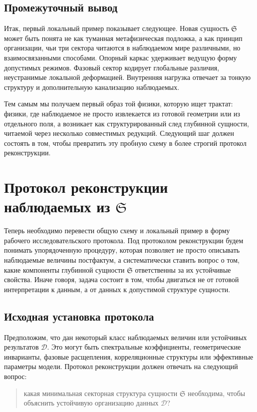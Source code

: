 \documentclass[12pt,a4paper]{article}
\begin{document}
\subsection{Промежуточный вывод}

Итак, первый локальный пример показывает следующее. Новая сущность \(\mathfrak{S}\) может быть понята не как туманная метафизическая подложка, а как принцип организации, чьи три сектора читаются в наблюдаемом мире различными, но взаимосвязанными способами. Опорный каркас удерживает ведущую форму допустимых режимов. Фазовый сектор кодирует глобальные различия, неустранимые локальной деформацией. Внутренняя нагрузка отвечает за тонкую структуру и дополнительную канализацию наблюдаемых.

Тем самым мы получаем первый образ той физики, которую ищет трактат: физики, где наблюдаемое не просто извлекается из готовой геометрии или из отдельного поля, а возникает как структурированный след глубинной сущности, читаемой через несколько совместимых редукций. Следующий шаг должен состоять в том, чтобы превратить эту пробную схему в более строгий протокол реконструкции.

\section{Протокол реконструкции наблюдаемых из \texorpdfstring{$\mathfrak{S}$}{S}}

Теперь необходимо перевести общую схему и локальный пример в форму рабочего исследовательского протокола. Под протоколом реконструкции будем понимать упорядоченную процедуру, которая позволяет не просто описывать наблюдаемые величины постфактум, а систематически ставить вопрос о том, какие компоненты глубинной сущности \(\mathfrak{S}\) ответственны за их устойчивые свойства. Иначе говоря, задача состоит в том, чтобы двигаться не от готовой интерпретации к данным, а от данных к допустимой структуре сущности.

\subsection{Исходная установка протокола}

Предположим, что дан некоторый класс наблюдаемых величин или устойчивых результатов \(\mathcal{D}\). Это могут быть спектральные коэффициенты, геометрические инварианты, фазовые расщепления, корреляционные структуры или эффективные параметры модели. Протокол реконструкции должен отвечать на следующий вопрос:
\begin{quote}
какая минимальная секторная структура сущности \(\mathfrak{S}\) необходима, чтобы объяснить устойчивую организацию данных \(\mathcal{D}\)?
\end{quote}
\end{document}
